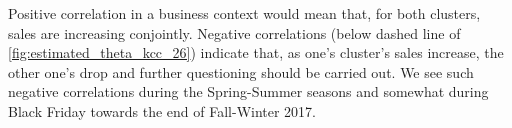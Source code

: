 Positive correlation in a business context would mean that, for both clusters, sales are increasing conjointly. Negative correlations (below dashed line of \autoref{fig:estimated_theta_kcc_26}) indicate that, as one's cluster's sales increase, the other one's drop and further questioning should be carried out. We see such negative correlations during the Spring-Summer seasons and somewhat during Black Friday towards the end of Fall-Winter 2017.


%
%
%
%
%
%







